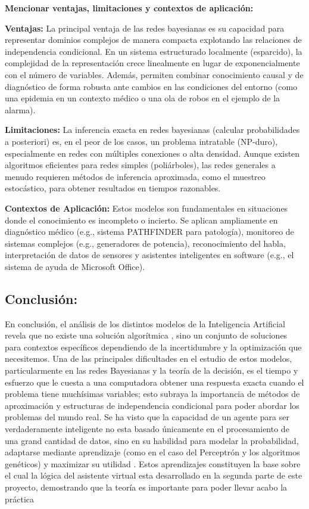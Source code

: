 \documentclass[letterpaper,12pt]{article}
\begin{document}
\textbf{Mencionar ventajas, limitaciones y contextos de aplicación:}

\textbf{Ventajas:} La principal ventaja de las redes bayesianas es su capacidad para representar dominios complejos de manera compacta explotando las relaciones de independencia condicional.  En un sistema estructurado localmente (esparcido), la complejidad de la representación crece linealmente en lugar de exponencialmente con el número de variables.  Además, permiten combinar conocimiento causal y de diagnóstico de forma robusta ante cambios en las condiciones del entorno (como una epidemia en un contexto médico o una ola de robos en el ejemplo de la alarma).

 \textbf{Limitaciones:} La inferencia exacta en redes bayesianas (calcular probabilidades a posteriori) es, en el peor de los casos, un problema intratable (NP-duro), especialmente en redes con múltiples conexiones o alta densidad.  Aunque existen algoritmos eficientes para redes simples (poliárboles), las redes generales a menudo requieren métodos de inferencia aproximada, como el muestreo estocástico, para obtener resultados en tiempos razonables.

\textbf{Contextos de Aplicación:} Estos modelos son fundamentales en situaciones donde el conocimiento es incompleto o incierto.  Se aplican ampliamente en diagnóstico médico (e.g., sistema PATHFINDER para patología), monitoreo de sistemas complejos (e.g., generadores de potencia), reconocimiento del habla, interpretación de datos de sensores y asistentes inteligentes en software (e.g., el sistema de ayuda de Microsoft Office).



\subsection{Conclusión:}

En conclusión, el análisis de los distintos modelos de la Inteligencia Artificial revela que no existe una solución algorítmica , sino un conjunto de soluciones  para contextos específicos dependiendo de la incertidumbre y la optimización que necesitemos. Una de las principales dificultades en el estudio de estos modelos, particularmente en las redes Bayesianas y la teoría de la decisión, es el tiempo y esfuerzo que le cuesta a una computadora obtener una respuesta exacta cuando el problema tiene muchísimas variables; esto subraya la importancia de métodos de aproximación y estructuras de independencia condicional para poder abordar los problemas del mundo real. Se ha visto que la capacidad de un agente para ser verdaderamente inteligente no esta basado únicamente en el procesamiento de una grand cantidad de datos, sino en su habilidad para modelar la probabilidad, adaptarse mediante aprendizaje (como en el caso del Perceptrón y los algoritmos genéticos) y maximizar su utilidad . Estos aprendizajes constituyen la base sobre el cual la lógica del asistente virtual esta desarrollado en la segunda parte de este proyecto, demostrando que la teoría es importante para poder llevar acabo la práctica
\end{document}
